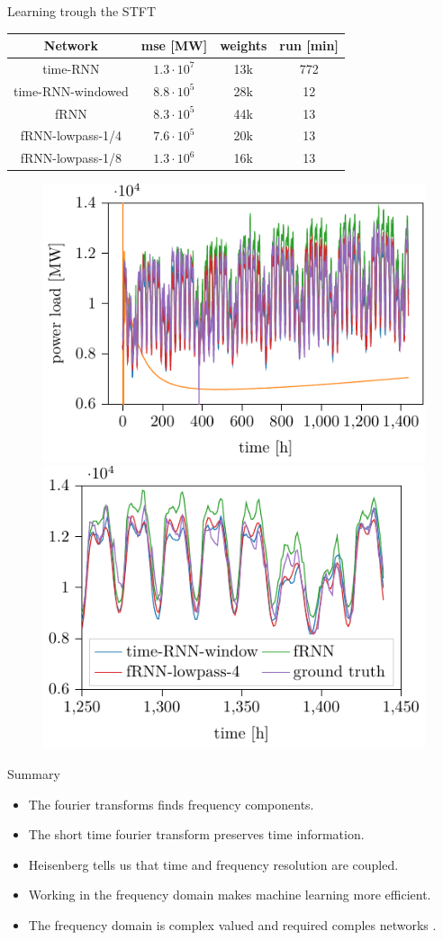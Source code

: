 \documentclass[xcolor=dvipsnames]{beamer}
\begin{document}
\begin{frame}{Learning trough the STFT \cite{wolter2018Fourier}}
\centering
\begin{tabular}{c c c c}
  Network   & mse [MW] & weights  & run [min]  \\\hline 
  time-RNN   & $1.3 \cdot 10^7$&  13k & 772 \\
  time-RNN-windowed   & $8.8 \cdot 10^5$&  28k & 12 \\
  fRNN   & $8.3 \cdot 10^5$&  44k & 13 \\
  fRNN-lowpass-1/4   & $7.6 \cdot 10^5$&  20k & 13 \\
  fRNN-lowpass-1/8   & $1.3 \cdot 10^6$&  16k & 13 \\
\end{tabular}
\begin{figure}
    \centering
    \includegraphics[width=0.48\linewidth]{./img/comparison_60d_fit.pdf}
    \includegraphics[width=0.48\linewidth]{./img/comparison_last_week_60d_fit.pdf}
\end{figure}
\end{frame}

\begin{frame}{Summary}
\begin{itemize}
\item The fourier transforms finds frequency components.
\item The short time fourier transform preserves time information.
\item Heisenberg tells us that time and frequency resolution are coupled.
\item Working in the frequency domain makes machine learning more efficient.
\item The frequency domain is complex valued and required comples networks \cite{wolter2018complexgated}.
\end{itemize}

\end{frame}
\end{document}
